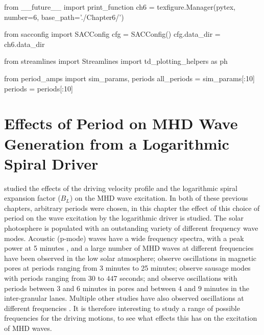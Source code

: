 \begin{pycode}[chapter6]
from __future__ import print_function
ch6 = texfigure.Manager(pytex, number=6, base_path='./Chapter6/')

from sacconfig import SACConfig
cfg = SACConfig()
cfg.data_dir = ch6.data_dir

from streamlines import Streamlines
import td_plotting_helpers as ph

from period_amps import sim_params, periods
all_periods = sim_params[:10]
periods = periods[:10]
\end{pycode}

\chapter{Effects of Period on MHD Wave Generation from a Logarithmic Spiral Driver}\label{ch:period}

 studied the effects of the driving velocity profile and the logarithmic spiral expansion factor ($B_L$) on the MHD wave excitation.
In both of these previous chapters, arbitrary periods were chosen, in this chapter the effect of this choice of period on the wave excitation by the logarithmic driver is studied.
The solar photosphere is populated with an outstanding variety of different frequency wave modes.
Acoustic (p-mode) waves have a wide frequency spectra, with a peak power at 5 minutes \citep{leighton1962}, and a large number of MHD waves at different frequencies have been observed in the low solar atmosphere; \cite{Freij2014,Dorotovic2014} observe oscillations in magnetic pores at periods ranging from 3 minutes to 25 minutes; \cite{morton2011} observe sausage modes with periods ranging from $30$ to $447$ seconds; and \cite{fujimura2009} observe oscillations with periods between $3$ and $6$ minutes in pores and between $4$ and $9$ minutes in the inter-granular lanes.
Multiple other studies have also observed oscillations at different frequencies  \cite[e.g.][]{mathioudakis2013,reznikova2012,morton2012,mcintosh2011,zaqarashvili2009,jess2009,vecchio2007,kobanov2006,bogdan2006}.
It is therefore interesting to study a range of possible frequencies for the driving motions, to see what effects this has on the excitation of MHD waves.

